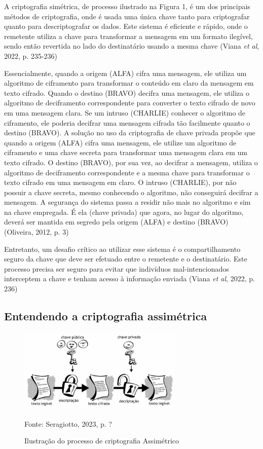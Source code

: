 A criptografia simétrica, de processo ilustrado na Figura 1, é um dos
principais métodos de criptografia, onde é usada uma única chave tanto para
criptografar quanto para descriptografar os dados. Este sistema é eficiente e
rápido, onde o remetente utiliza a chave para transformar a mensagem em um
formato ilegível, sendo então revertida no lado do destinatário usando a mesma
chave (Viana \textit{et al}, 2022, p. 235-236)

\begin{CitacaoLonga}
	Essencialmente, quando a origem (ALFA) cifra uma mensagem, ele utiliza um
	algoritmo de ciframento para transformar o conteúdo em claro da mensagem em
	texto cifrado. Quando o destino (BRAVO) decifra uma mensagem, ele utiliza o
	algoritmo de deciframento correspondente para converter o texto cifrado de novo
	em uma mensagem clara. Se um intruso (CHARLIE) conhecer o algoritmo de
	ciframento, ele poderia decifrar uma mensagem cifrada tão facilmente quanto o
	destino (BRAVO). A solução no uso da criptografia de chave privada propõe que
	quando a origem (ALFA) cifra uma mensagem, ele utilize um algoritmo de
	ciframento e uma chave secreta para transformar uma mensagem clara em um texto
	cifrado. O destino (BRAVO), por sua vez, ao decifrar a mensagem, utiliza o
	algoritmo de deciframento correspondente e a mesma chave para transformar o
	texto cifrado em uma mensagem em claro. O intruso (CHARLIE), por não possuir a
	chave secreta, mesmo conhecendo o algoritmo, não conseguirá decifrar a
	mensagem. A segurança do sistema passa a residir não mais no algoritmo e sim na
	chave empregada. É ela (chave privada) que agora, no lugar do algoritmo, deverá
	ser mantida em segredo pela origem (ALFA) e destino (BRAVO) (Oliveira, 2012, p. 3)
\end{CitacaoLonga}

Entretanto, um desafio crítico ao utilizar esse sistema é o compartilhamento
seguro da chave que deve ser efetuado entre o remetente e o destinatário. Este
processo precisa ser seguro para evitar que indivíduos mal-intencionados
interceptem a chave e tenham acesso à informação enviada (Viana \textit{et al},
2022, p. 236)

\subsection{Entendendo a criptografia assimétrica}

\begin{figure}[h!] \centering
	\includegraphics[width=0.7\textwidth]{Imagens/ilustracao_do_processo_de_criptografia_assimetrico}
	\caption{Ilustração do processo de criptografia Assimétrico}
	Fonte: Seragiotto, 2023, p. ?
\end{figure}


